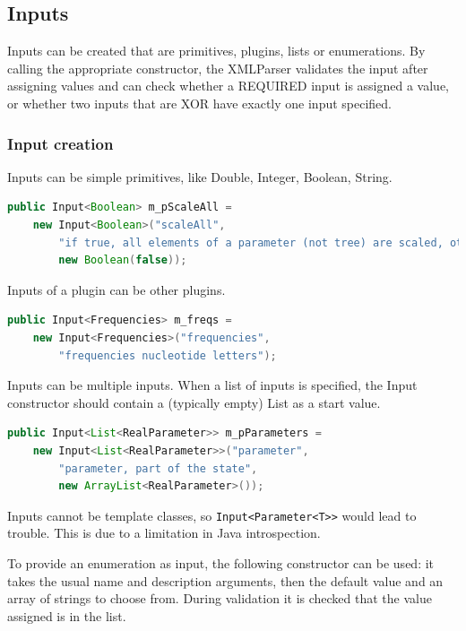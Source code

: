 \documentclass{article}
\begin{document}
\subsection{Inputs\label{ssec.input}}

Inputs can be created that are primitives, plugins, lists or enumerations.
By calling the appropriate constructor, the XMLParser validates the input
after assigning values and can check whether a REQUIRED input is assigned
a value, or whether two inputs that are XOR have exactly one input specified.


\subsubsection{Input creation}
Inputs can be simple primitives, like Double, Integer, Boolean, String.


{\color{blue}\begin{lstlisting}[language=java]
public Input<Boolean> m_pScaleAll = 
    new Input<Boolean>("scaleAll", 
        "if true, all elements of a parameter (not tree) are scaled, otherwise one is randomly selected",
        new Boolean(false));
\end{lstlisting}}

Inputs of a plugin can be other plugins.

{\color{blue}\begin{lstlisting}[language=java]
public Input<Frequencies> m_freqs = 
    new Input<Frequencies>("frequencies", 
        "frequencies nucleotide letters");
\end{lstlisting}}

Inputs can be multiple inputs. When a list of inputs is specified,
the Input constructor should contain a (typically empty) List as a start value.

{\color{blue}\begin{lstlisting}[language=java]
public Input<List<RealParameter>> m_pParameters = 
    new Input<List<RealParameter>>("parameter", 
        "parameter, part of the state",
        new ArrayList<RealParameter>());
\end{lstlisting}}

Inputs cannot be template classes, so {\tt Input<Parameter<T>>} would lead to
trouble. This is due to a limitation in Java introspection.

To provide an enumeration as input, the following constructor can be
used: it takes the usual name and description arguments, then the default
value and an array of strings to choose from. During validation it is 
checked that the value assigned is in the list.
\end{document}
